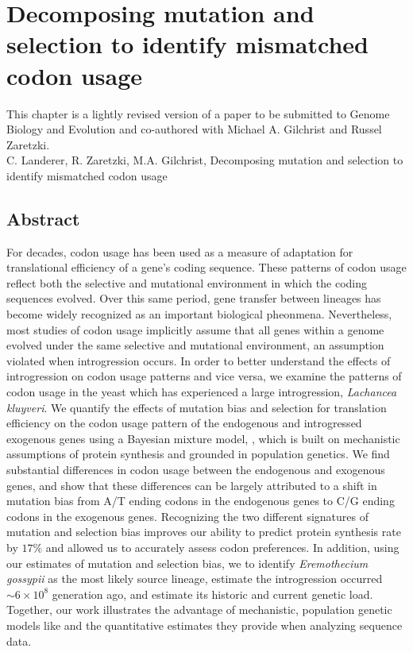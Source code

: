 \chapter{Decomposing mutation and selection to identify mismatched codon usage}
\label{ch:kluyveri}

\clearpage
\pagebreak

This chapter is a lightly revised version of a paper to be submitted to Genome Biology and Evolution and co-authored with Michael A. Gilchrist and Russel Zaretzki.\\
\newline
\newline
C. Landerer, R. Zaretzki, M.A. Gilchrist, Decomposing mutation and selection to identify mismatched codon usage

\section{Abstract}
For decades, codon usage has been used as a measure of adaptation for translational efficiency of a gene's coding sequence.
These patterns of codon usage reflect both the selective and mutational environment in which the coding sequences evolved. %
Over this same period, gene transfer between lineages has become widely recognized as an important biological pheonmena.
Nevertheless, most studies of codon usage implicitly assume that all genes within a genome evolved under the same selective and mutational environment, an assumption violated when introgression occurs. %
In order to better understand the effects of introgression on codon usage patterns and vice versa,  we examine the patterns of codon usage in the yeast which has experienced a large introgression, \textit{Lachancea kluyveri}.
We quantify the effects of mutation bias and selection for translation efficiency on the codon usage pattern of the endogenous and introgressed exogenous genes using a Bayesian mixture model, \ROC, which is built on mechanistic assumptions of protein synthesis and grounded in population genetics.
We find substantial differences in codon usage between the endogenous and exogenous genes, and show that these differences can be largely attributed to a shift in mutation bias from A/T ending codons in the endogenous genes to C/G ending codons in the exogenous genes.
Recognizing the two different signatures of mutation and selection bias improves our ability to predict protein synthesis rate by $17 \%$ and allowed us to accurately assess codon preferences.
In addition, using our estimates of mutation and selection bias, we to identify \textit{Eremothecium gossypii} as the most likely source lineage, estimate the introgression occurred $\sim 6\times 10^8$ generation ago, and estimate its historic and current genetic load.
Together, our work illustrates the advantage of mechanistic, population genetic models like \ROC and the quantitative estimates they provide when analyzing sequence data.

